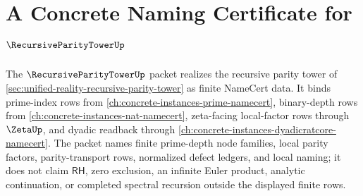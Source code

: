 \chapter{A Concrete Naming Certificate for $\RecursiveParityTowerUp$}
\label{ch:concrete-instances-recursive-parity-tower-namecert}

The $\RecursiveParityTowerUp$ packet realizes the recursive parity tower of \autoref{sec:unified-reality-recursive-parity-tower} as finite NameCert data. It binds prime-index rows from \autoref{ch:concrete-instances-prime-namecert}, binary-depth rows from \autoref{ch:concrete-instances-nat-namecert}, zeta-facing local-factor rows through $\ZetaUp$, and dyadic readback through \autoref{ch:concrete-instances-dyadicratcore-namecert}. The packet names finite prime-depth node families, local parity factors, parity-transport rows, normalized defect ledgers, and local naming; it does not claim $\mathsf{RH}$, zero exclusion, an infinite Euler product, analytic continuation, or completed spectral recursion outside the displayed finite rows.

